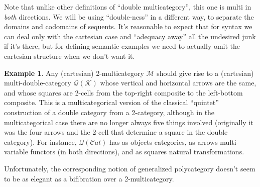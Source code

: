 \documentclass{article}
\theoremstyle{definition}
\newtheorem{eg}{Example}
\def\M{\mathcal{M}}
\def\K{\mathcal{K}}
\def\Q{\mathcal{Q}}
\def\Cat{\mathcal{C}\mathit{at}}
\begin{document}
Note that unlike other definitions of ``double multicategory'', this one is multi in \emph{both} directions.
We will be using ``double-ness'' in a different way, to separate the domains and codomains of sequents.
It's reasonable to expect that for syntax we can deal only with the cartesian case and ``adequacy away'' all the undesired junk if it's there, but for defining semantic examples we need to actually omit the cartesian structure when we don't want it.

\begin{eg}\label{eg:quintet}
  Any (cartesian) 2-multicategory $\M$ should give rise to a (cartesian) multi-double-category $\Q(\K)$ whose vertical and horizontal arrows are the same, and whose squares are 2-cells from the top-right composite to the left-bottom composite.
  This is a multicategorical version of the classical ``quintet'' construction of a double category from a 2-category, although in the multicategorical case there are no longer always five things involved (originally it was the four arrows and the 2-cell that determine a square in the double category).
  For instance, $\Q(\Cat)$ has as objects categories, as arrows multi-variable functors (in both directions), and as squares natural transformations.
\end{eg}

Unfortunately, the corresponding notion of generalized polycategory doesn't seem to be as elegant as a bifibration over a 2-multicategory.
\end{document}
